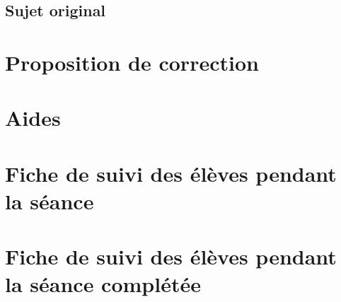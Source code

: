 \documentclass[12pt,a4paper, fleqn]{report}
\begin{document}
\section{Sujet original}
\label{ann:sujet}




\chapter{Proposition de correction}
\label{ann:corr}



\chapter{Aides}
\label{ann:aides}



\chapter{Fiche de suivi des élèves pendant la séance}
\label{ann:suivi}



\chapter{Fiche de suivi des élèves pendant la séance complétée}
\label{ann:suivi_comp}
\end{document}
